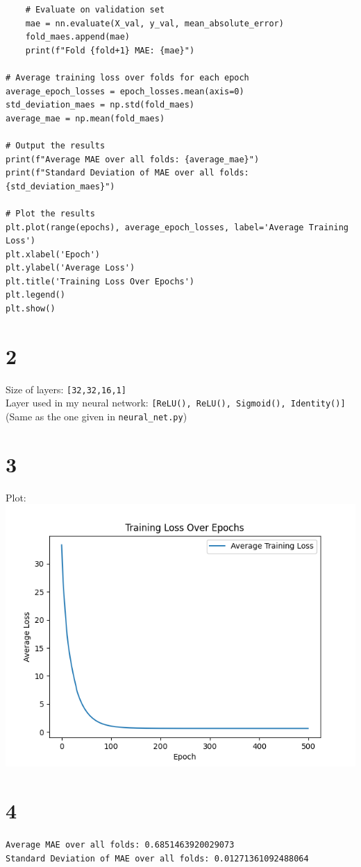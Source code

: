 \documentclass[12pt]{article}
\begin{document}
\begin{enumerate}
\begin{lstlisting}
    # Evaluate on validation set
    mae = nn.evaluate(X_val, y_val, mean_absolute_error)
    fold_maes.append(mae)
    print(f"Fold {fold+1} MAE: {mae}")

# Average training loss over folds for each epoch
average_epoch_losses = epoch_losses.mean(axis=0)
std_deviation_maes = np.std(fold_maes)
average_mae = np.mean(fold_maes)

# Output the results
print(f"Average MAE over all folds: {average_mae}")
print(f"Standard Deviation of MAE over all folds: {std_deviation_maes}")

# Plot the results
plt.plot(range(epochs), average_epoch_losses, label='Average Training Loss')
plt.xlabel('Epoch')
plt.ylabel('Average Loss')
plt.title('Training Loss Over Epochs')
plt.legend()
plt.show()

\end{lstlisting}

\newpage
\part{2} 
Size of layers: \texttt{[32,32,16,1]} \\
Layer used in my neural network: \texttt{[ReLU(), ReLU(), Sigmoid(), Identity()]}\\
(Same as the one given in \texttt{neural\_net.py})\\

\part{3}
Plot:\\
\includegraphics[width=\textwidth /3 * 2]{Q2/Q2.png}\\

\part{4}
\texttt{Average MAE over all folds: 0.6851463920029073\\
Standard Deviation of MAE over all folds: 0.01271361092488064}

\end{enumerate}

\end{document}
